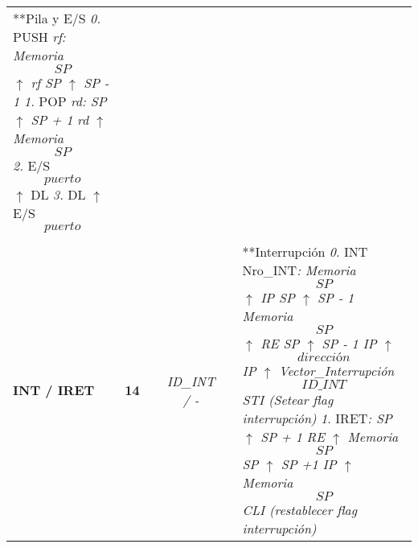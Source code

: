 \documentclass[12pt,twoside]{templates/unerthesis}
\begin{document}
\begin{longtable}[]{@{}lccccl@{}}
\begin{minipage}[t]{0.14\columnwidth}
**Pila y E/S \emph{0.} PUSH \emph{rf: Memoria\[SP\] \(\uparrow\) rf SP \(\uparrow\) SP - 1 1.} POP \emph{rd: SP \(\uparrow\) SP + 1 rd \(\uparrow\) Memoria\[SP\] 2.} E/S\[puerto\] \(\uparrow\) DL \emph{3.} DL \(\uparrow\)E/S\[puerto\]\strut
\end{minipage}\tabularnewline
\begin{minipage}[t]{0.14\columnwidth}\raggedright
\strut
\end{minipage} & \begin{minipage}[t]{0.14\columnwidth}\centering
\strut
\end{minipage} & \begin{minipage}[t]{0.14\columnwidth}\centering
\strut
\end{minipage} & \begin{minipage}[t]{0.14\columnwidth}\centering
\strut
\end{minipage} & \begin{minipage}[t]{0.14\columnwidth}\centering
\strut
\end{minipage} & \begin{minipage}[t]{0.14\columnwidth}\raggedright
\strut
\end{minipage}\tabularnewline
\begin{minipage}[t]{0.14\columnwidth}\raggedright
\textbf{INT / IRET}\strut
\end{minipage} & \begin{minipage}[t]{0.14\columnwidth}\centering
\textbf{14}\strut
\end{minipage} & \begin{minipage}[t]{0.14\columnwidth}\centering
\strut
\end{minipage} & \begin{minipage}[t]{0.14\columnwidth}\centering
\emph{ID\_INT / -}\strut
\end{minipage} & \begin{minipage}[t]{0.14\columnwidth}\centering
\strut
\end{minipage} & \begin{minipage}[t]{0.14\columnwidth}\raggedright
**Interrupción \emph{0.} INT Nro\_INT\emph{: Memoria\[SP\] \(\uparrow\) IP SP \(\uparrow\) SP - 1 Memoria\[SP\] \(\uparrow\) RE SP \(\uparrow\) SP - 1 IP \(\uparrow\) \[dirección\] IP \(\uparrow\) Vector\_Interrupción\[ID\_INT\] STI (Setear flag interrupción)} \emph{1.} IRET\emph{: SP \(\uparrow\) SP + 1 RE \(\uparrow\) Memoria\[SP\] SP \(\uparrow\) SP +1 IP \(\uparrow\) Memoria\[SP\] CLI (restablecer flag interrupción)}\strut
\end{minipage}\tabularnewline

\end{longtable}
\end{document}
